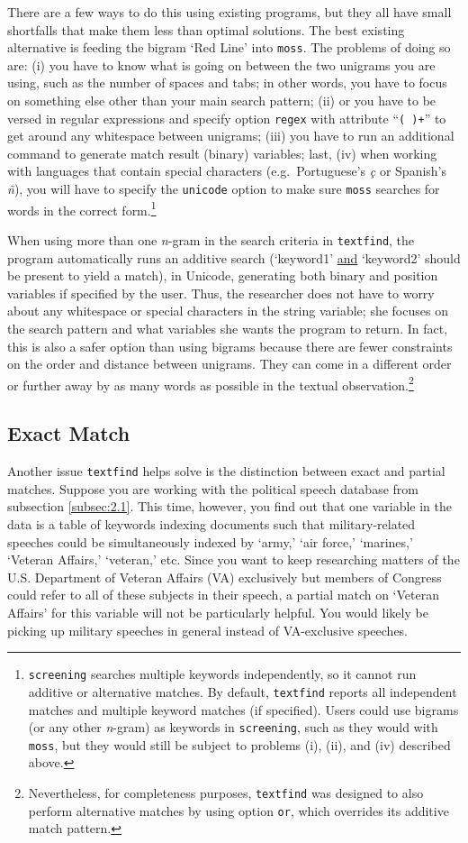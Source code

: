 There are a few ways to do this using existing programs, but they all have small shortfalls that make them less than optimal solutions. The best existing alternative is feeding the bigram `Red Line' into {\tt moss}. The problems of doing so are: (i) you have to know what is going on between the two unigrams you are using, such as the number of spaces and tabs; in other words, you have to focus on something else other than your main search pattern; (ii) or you have to be versed in regular expressions and specify option {\tt regex} with attribute ``{\tt ( )+}'' to get around any whitespace between unigrams; (iii) you have to run an additional command to generate match result (binary) variables; last, (iv) when working with languages that contain special characters (e.g.~Portuguese's  {\it \c c} or Spanish's {\it \~ n}), you will have to specify the {\tt unicode} option to make sure {\tt moss} searches for words in the correct form.\footnote{{\tt screening} searches multiple keywords independently, so it cannot run additive or alternative matches. By default, {\tt textfind} reports all independent matches and multiple keyword matches (if specified). Users could use bigrams (or any other {\it n}-gram) as keywords in {\tt screening}, such as they would with {\tt moss}, but they would still be subject to problems (i), (ii), and (iv) described above.}

When using more than one {\it n}-gram in the search criteria in {\tt textfind}, the program automatically runs an additive search (`keyword1' \underline{and} `keyword2' should be present to yield a match), in Unicode, generating both binary and position variables if specified by the user. Thus, the researcher does not have to worry about any whitespace or special characters in the string variable; she focuses on the search pattern and what variables she wants the program to return. In fact, this is also a safer option than using bigrams because there are fewer constraints on the order and distance between unigrams. They can come in a different order or further away by as many words as possible in the textual observation.\footnote{Nevertheless, for completeness purposes, {\tt textfind} was designed to also perform alternative matches by using option {\tt or}, which overrides its additive match pattern.}

\subsection[Exact]{Exact Match}
Another issue {\tt textfind} helps solve is the distinction between exact and partial matches. Suppose you are working with the political speech database from subsection \ref{subsec:2.1}. This time, however, you find out that one variable in the data is a table of keywords indexing documents such that military-related speeches could be simultaneously indexed by `army,' `air force,' `marines,' `Veteran Affairs,' `veteran,' etc. Since you want to keep researching matters of the U.S. Department of Veteran Affairs (VA) exclusively but members of Congress could refer to all of these subjects in their speech, a partial match on `Veteran Affairs' for this variable will not be particularly helpful. You would likely be picking up military speeches in general instead of VA-exclusive speeches.

